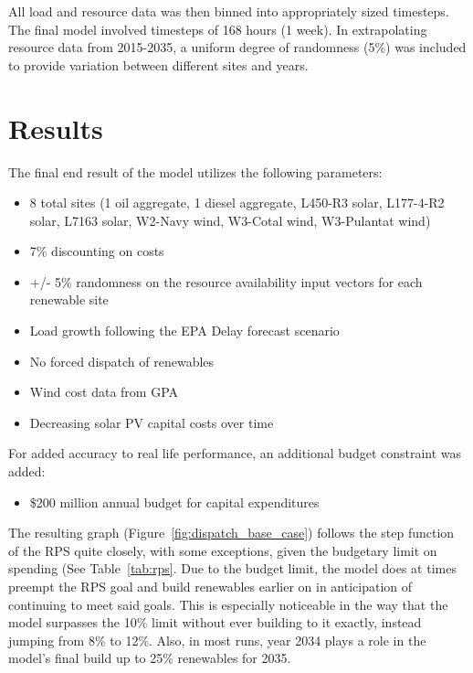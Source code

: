 \documentclass[12pt,letterpaper,fleqn]{article}
\begin{document}
All load and resource data was then binned into appropriately sized
timesteps. The final model involved timesteps of 168 hours (1
week). In extrapolating resource data from 2015-2035, a uniform
degree of randomness (5\%) was included to provide variation between
different sites and years. 

\section{Results}

The final end result of the model utilizes the following parameters:
\begin{itemize}
\item 8 total sites (1 oil aggregate, 1 diesel aggregate, L450-R3
  solar, L177-4-R2 solar, L7163 solar, W2-Navy wind, W3-Cotal wind,
  W3-Pulantat wind)
\item 7\% discounting on costs
\item +/- 5\% randomness on the resource availability input vectors
  for each renewable site
\item Load growth following the EPA Delay forecast scenario
\item No forced dispatch of renewables
\item Wind cost data from GPA
\item Decreasing solar PV capital costs over time
\end{itemize}

For added accuracy to real life performance, an additional budget
constraint was added:
\begin{itemize}
\item \$200 million annual budget for capital expenditures
\end{itemize}

The resulting graph (Figure~\ref{fig:dispatch_base_case}) follows the
step function of the RPS quite closely, with some exceptions, given
the budgetary limit on spending (See Table~\ref{tab:rps}. Due to the
budget limit, the model does at times preempt the RPS goal and build
renewables earlier on in anticipation of continuing to meet said
goals. This is especially noticeable in the way that the model
surpasses the 10\% limit without ever building to it exactly, instead
jumping from 8\% to 12\%. Also, in most runs, year 2034 plays a role
in the model’s final build up to 25\% renewables for 2035.
\end{document}
